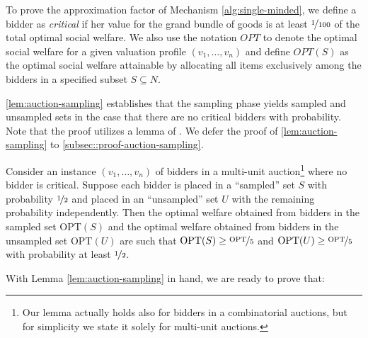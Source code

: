 To prove the approximation factor of Mechanism \ref{alg:single-minded}, 
we define a bidder as \emph{critical} if her value for the grand bundle of goods is at least $\nicefrac{1}{100}$ of the total optimal social welfare. We also use the notation $OPT$ to denote the optimal social welfare for a given valuation profile $(v_1, \ldots, v_n)$ and define $OPT(S)$ as the optimal social welfare attainable by allocating all items exclusively among the bidders in a specified subset $S \subseteq N$.

\cref{lem:auction-sampling} establishes that the sampling phase yields 
sampled and unsampled sets in the case that there are no critical bidders with  probability. Note that the proof utilizes a lemma of \cite{bei2017worst}. %
We defer the proof of \cref{lem:auction-sampling}  to 
\cref{subsec::proof-auction-sampling}. 

\begin{lemma}\label{lem:auction-sampling}
Consider an instance $(v_1,\ldots,v_n)$ of bidders
in a multi-unit auction\footnote{
Our lemma actually holds also for bidders in a combinatorial auctions,  
but for simplicity we state it solely for multi-unit auctions.} where no bidder is critical.  Suppose each bidder is placed in a ``sampled'' set $S$ with probability $\nicefrac 1 2$ and placed in an ``unsampled'' set $U$ with the remaining probability independently. Then the optimal welfare obtained from bidders in the sampled set $\text{OPT}(S)$ and the optimal welfare obtained from bidders in the unsampled set $\text{OPT}(U)$ are such that $\text{OPT}(S) \geq \nicefrac{\text{OPT}}{5}$ and $\text{OPT}(U) \geq \nicefrac{\text{OPT}}{5}$ with probability at least $\nicefrac{1}{2}$.
\end{lemma}

With Lemma \ref{lem:auction-sampling} in hand, we are ready to prove that: 

